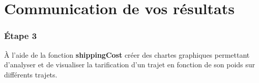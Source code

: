 \section{Communication de vos résultats}
 
\begin{frame}[fragile=singleslide]
  \frametitle{Étape 3}

À l'aide de la fonction \textbf{shippingCost} créer des chartes graphiques permettant d'analyser et de visualiser la tarification d'un trajet en fonction de son poids sur différents trajets.
\end{frame}

